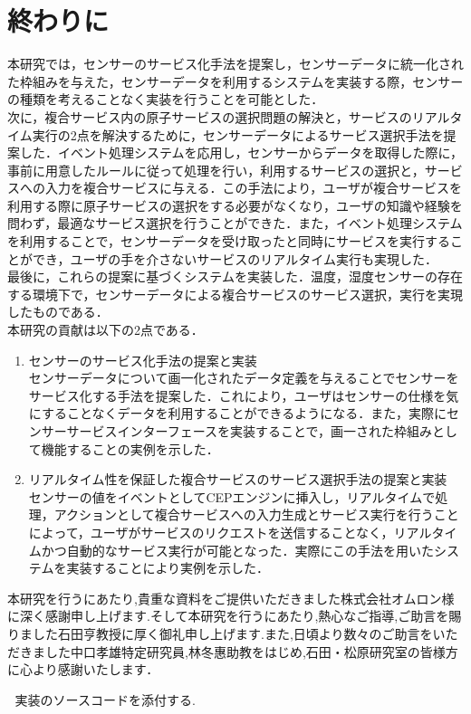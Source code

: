 \documentclass{kuisthesis}			%
\begin{document}
\section{終わりに}
本研究では，センサーのサービス化手法を提案し，センサーデータに統一化された枠組みを与えた，センサーデータを利用するシステムを実装する際，センサーの種類を考えることなく実装を行うことを可能とした．\\
次に，複合サービス内の原子サービスの選択問題の解決と，サービスのリアルタイム実行の2点を解決するために，センサーデータによるサービス選択手法を提案した．イベント処理システムを応用し，センサーからデータを取得した際に，事前に用意したルールに従って処理を行い，利用するサービスの選択と，サービスへの入力を複合サービスに与える．この手法により，ユーザが複合サービスを利用する際に原子サービスの選択をする必要がなくなり，ユーザの知識や経験を問わず，最適なサービス選択を行うことができた．また，イベント処理システムを利用することで，センサーデータを受け取ったと同時にサービスを実行することができ，ユーザの手を介さないサービスのリアルタイム実行も実現した．\\
最後に，これらの提案に基づくシステムを実装した．温度，湿度センサーの存在する環境下で，センサーデータによる複合サービスのサービス選択，実行を実現したものである．\\
本研究の貢献は以下の2点である．
\begin{enumerate}
\item センサーのサービス化手法の提案と実装\\
センサーデータについて画一化されたデータ定義を与えることでセンサーをサービス化する手法を提案した．これにより，ユーザはセンサーの仕様を気にすることなくデータを利用することができるようになる．また，実際にセンサーサービスインターフェースを実装することで，画一された枠組みとして機能することの実例を示した．
\item リアルタイム性を保証した複合サービスのサービス選択手法の提案と実装\\
センサーの値をイベントとしてCEPエンジンに挿入し，リアルタイムで処理，アクションとして複合サービスへの入力生成とサービス実行を行うことによって，ユーザがサービスのリクエストを送信することなく，リアルタイムかつ自動的なサービス実行が可能となった．実際にこの手法を用いたシステムを実装することにより実例を示した．
\end{enumerate}

\acknowledgments				%
本研究を行うにあたり,貴重な資料をご提供いただきました株式会社オムロン様に深く感謝申し上げます.そして本研究を行うにあたり,熱心なご指導,ご助言を賜りました石田亨教授に厚く御礼申し上げます.また,日頃より数々のご助言をいただきました中口孝雄特定研究員,林冬惠助教をはじめ,石田・松原研究室の皆様方に心より感謝いたします．
\nocite{*}


\Appendix[付録]
実装のソースコードを添付する.
\end{document}
